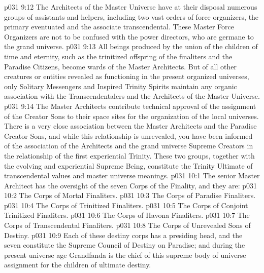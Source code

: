 \vs p031 9:12 The Architects of the Master Universe have at their disposal numerous groups of assistants and helpers, including two vast orders of force organizers, the primary eventuated and the associate transcendental. These Master Force Organizers are not to be confused with the power directors, who are germane to the grand universe.
\vs p031 9:13 All beings produced by the union of the children of time and eternity, such as the trinitized offspring of the finaliters and the Paradise Citizens, become wards of the Master Architects. But of all other creatures or entities revealed as functioning in the present organized universes, only Solitary Messengers and Inspired Trinity Spirits maintain any organic association with the Transcendentalers and the Architects of the Master Universe.
\vs p031 9:14 The Master Architects contribute technical approval of the assignment of the Creator Sons to their space sites for the organization of the local universes. There is a very close association between the Master Architects and the Paradise Creator Sons, and while this relationship is unrevealed, you have been informed of the association of the Architects and the grand universe Supreme Creators in the relationship of the first experiential Trinity. These two groups, together with the evolving and experiential Supreme Being, constitute the Trinity Ultimate of transcendental values and master universe meanings.
\vs p031 10:1 The senior Master Architect has the oversight of the seven Corps of the Finality, and they are:
\vs p031 10:2 \bibnobreakspace The Corps of Mortal Finaliters.
\vs p031 10:3 \bibnobreakspace The Corps of Paradise Finaliters.
\vs p031 10:4 \bibnobreakspace The Corps of Trinitized Finaliters.
\vs p031 10:5 \bibnobreakspace The Corps of Conjoint Trinitized Finaliters.
\vs p031 10:6 \bibnobreakspace The Corps of Havona Finaliters.
\vs p031 10:7 \bibnobreakspace The Corps of Transcendental Finaliters.
\vs p031 10:8 \bibnobreakspace The Corps of Unrevealed Sons of Destiny.
\vs p031 10:9 Each of these destiny corps has a presiding head, and the seven constitute the Supreme Council of Destiny on Paradise; and during the present universe age Grandfanda is the chief of this supreme body of universe assignment for the children of ultimate destiny.
